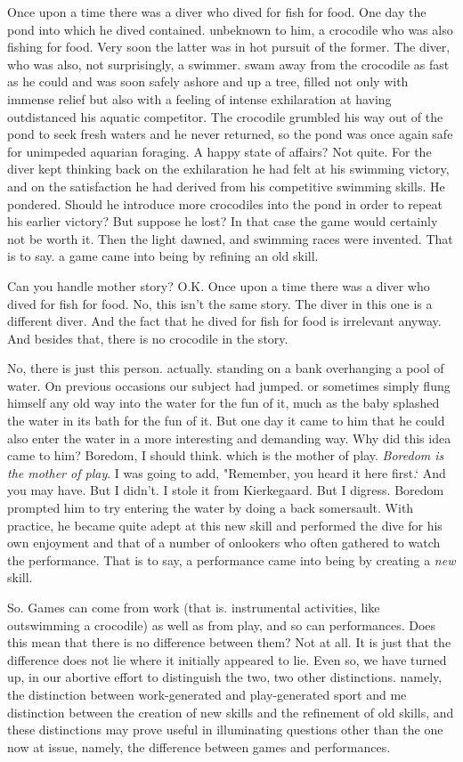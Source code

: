 \documentclass{tufte-handout}
\begin{document}
Once upon a time there was a diver who dived for fish for food. One day the pond into which he dived contained. unbeknown to him, a crocodile who was also fishing for food. Very soon the latter was in hot pursuit of the former. The diver, who was also, not surprisingly, a swimmer. swam away from the crocodile as fast as he could and was soon safely ashore and up a tree, filled not only with immense relief but also with a feeling of intense exhilaration at having outdistanced his aquatic competitor. The crocodile grumbled his way out of the pond to seek fresh waters and he never returned, so the pond was once again safe for unimpeded aquarian foraging. A happy state of affairs? Not quite. For the diver kept thinking back on the exhilaration he had felt at his swimming victory, and on the satisfaction he had derived from his competitive swimming skills. He pondered. Should he introduce more crocodiles into the pond in order to repeat his earlier victory? But suppose he lost? In that case the game would certainly not be worth it. Then the light dawned, and swimming races were invented. That is to say. a game came into being by refining an old skill.
 
Can you handle mother story? O.K. Once upon a time there was a diver who dived for fish for food. No, this isn’t the same story. The diver in this one is a different diver. And the fact that he dived for fish for food is irrelevant anyway. And besides that, there is no crocodile in the story.
 
No, there is just this person. actually. standing on a bank overhanging a pool of water. On previous occasions our subject had jumped. or sometimes simply flung himself any old way into the water for the fun of it, much as the baby splashed the water in its bath for the fun of it. But one day it came to him that he could also enter the water in a more interesting and demanding way. Why did this idea came to him? Boredom, I should think. which is the mother of play. \textit{Boredom is the mother of play}. I was going to add, "Remember, you heard it here first.‘ And you may have. But I didn't. I stole it from Kierkegaard. But I digress. Boredom prompted him to try entering the water by doing a back somersault. With practice, he became quite adept at this new skill and performed the dive for his own enjoyment and that of a number of onlookers who often gathered to watch the performance. That is to say, a performance came into being by creating a \textit{new} skill. 

So. Games can come from work (that is. instrumental activities, like outswimming a crocodile) as well as from play, and so can performances. Does this mean that there is no difference between them? Not at all. It is just that the difference does not lie where it initially appeared to lie. Even so, we have turned up, in our abortive effort to distinguish the two, two other distinctions. namely, the distinction between work-generated and play-generated sport and me distinction between the creation of new skills and the refinement of old skills, and these distinctions may prove useful in illuminating questions other than the one now at issue, namely, the difference between games and performances. 
\end{document}
